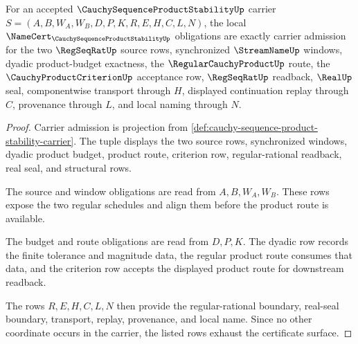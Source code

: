 \begin{theorem}
\label{thm:cauchy-sequence-product-stability-namecert-obligations}
For an accepted $\CauchySequenceProductStabilityUp$ carrier $S=(A,B,W_A,W_B,D,P,K,R,E,H,C,L,N)$, the local $\NameCert_{\CauchySequenceProductStabilityUp}$ obligations are exactly carrier admission for the two $\RegSeqRatUp$ source rows, synchronized $\StreamNameUp$ windows, dyadic product-budget exactness, the $\RegularCauchyProductUp$ route, the $\CauchyProductCriterionUp$ acceptance row, $\RegSeqRatUp$ readback, $\RealUp$ seal, componentwise transport through $H$, displayed continuation replay through $C$, provenance through $L$, and local naming through $N$.
\end{theorem}
\begin{proof}
Carrier admission is projection from \autoref{def:cauchy-sequence-product-stability-carrier}. The tuple displays the two source rows, synchronized windows, dyadic product budget, product route, criterion row, regular-rational readback, real seal, and structural rows.

The source and window obligations are read from $A,B,W_A,W_B$. These rows expose the two regular schedules and align them before the product route is available.

The budget and route obligations are read from $D,P,K$. The dyadic row records the finite tolerance and magnitude data, the regular product route consumes that data, and the criterion row accepts the displayed product route for downstream readback.

The rows $R,E,H,C,L,N$ then provide the regular-rational boundary, real-seal boundary, transport, replay, provenance, and local name. Since no other coordinate occurs in the carrier, the listed rows exhaust the certificate surface.
\end{proof}

